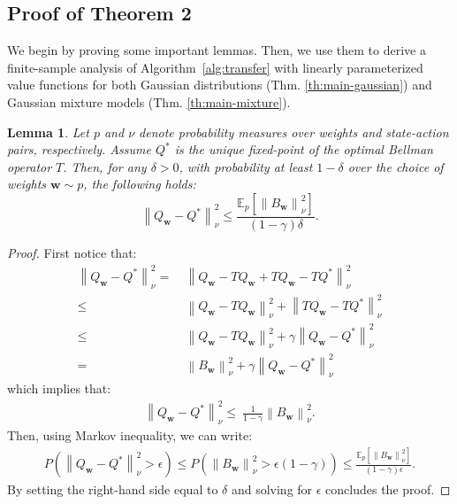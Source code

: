 \documentclass{article}
\newtheorem{lemma}{Lemma}
\newcommand{\norm}[1]{\left\lVert #1 \right\rVert}
\begin{document}
\subsection{Proof of Theorem 2}\label{app:a2}

We begin by proving some important lemmas. Then, we use them to derive a finite-sample analysis of Algorithm~\ref{alg:transfer} with linearly parameterized value functions for both Gaussian distributions (Thm. \ref{th:main-gaussian}) and Gaussian mixture models (Thm. \ref{th:main-mixture}).

\begin{lemma}\label{lemma:l1}
Let $p$ and $\nu$ denote probability measures over weights and state-action pairs, respectively. Assume $Q^*$ is the unique fixed-point of the optimal Bellman operator $T$. Then, for any $\delta > 0$, with probability at least $1 - \delta$ over the choice of weights $\bm{w} \sim p$, the following holds:
\begin{equation}
\norm{Q_{\bm{w}} - Q^*}_{\nu}^2 \leq \frac{\mathbb{E}_p\left[ \norm{B_{\bm{w}}}_{\nu}^2 \right]}{(1-\gamma)\delta}.
\end{equation}
\end{lemma}
\begin{proof}
First notice that:
\begin{align*}
\norm{Q_{\bm{w}} - Q^*}_{\nu}^2 =\ & \norm{Q_{\bm{w}} - TQ_{\bm{w}} + TQ_{\bm{w}} - TQ^*}_{\nu}^2\\ \leq\ & \norm{Q_{\bm{w}} - TQ_{\bm{w}}}_{\nu}^2 + \norm{TQ_{\bm{w}} - TQ^*}_{\nu}^2\\ \leq\ & \norm{Q_{\bm{w}} - TQ_{\bm{w}}}_{\nu}^2 + \gamma\norm{Q_{\bm{w}} - Q^*}_{\nu}^2\\ =\ & \norm{B_{\bm{w}}}_{\nu}^2 + \gamma\norm{Q_{\bm{w}} - Q^*}_{\nu}^2
\end{align*}
which implies that:
\begin{align*}
\norm{Q_{\bm{w}} - Q^*}_{\nu}^2 \leq\ \frac{1}{1-\gamma}\norm{B_{\bm{w}}}_{\nu}^2.
\end{align*}
Then, using Markov inequality, we can write:
\begin{align*}
P\left( \norm{Q_{\bm{w}} - Q^*}_{\nu}^2 > \epsilon \right) \leq P\left(\norm{B_{\bm{w}}}_{\nu}^2 > \epsilon (1-\gamma)\right) \leq \frac{\mathbb{E}_p\left[ \norm{B_{\bm{w}}}_{\nu}^2 \right]}{(1-\gamma)\epsilon}.
\end{align*}
By setting the right-hand side equal to $\delta$ and solving for $\epsilon$ concludes the proof.
\end{proof}
\end{document}
